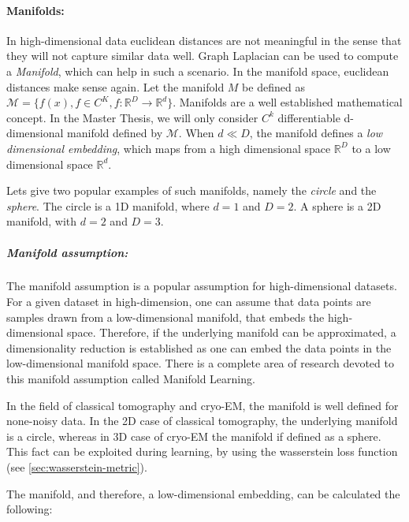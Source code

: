 \paragraph{Manifolds:}
\label{sec:manifolds}

In high-dimensional data euclidean distances are not meaningful in the sense that they will not capture similar data well.
Graph Laplacian can be used to compute a \textit{Manifold}, which can help in such a scenario. In the manifold space, euclidean distances make sense again. 
Let the manifold $M$ be defined as $\mathcal{M} = \{ f(x), f \in C^K, f: \mathbb{R}^D \to \mathbb{R}^d \}$.
Manifolds are a well established mathematical concept. In the Master Thesis, we will only consider 
$C^k$ differentiable d-dimensional manifold defined by $\mathcal{M}$. 
When $d \ll D$, the manifold defines a \textit{low dimensional embedding}, which maps from a high dimensional space 
$\mathbb{R}^D$ to a low dimensional space $\mathbb{R}^d$.

Lets give two popular examples of such manifolds, namely the \textit{circle} and the \textit{sphere}.
The circle is a 1D manifold, where $d=1$ and $D=2$. A sphere is a 2D manifold, with $d=2$ and $D=3$.

\subparagraph{Manifold assumption:}
\label{sec:manifoldAssumption}
The manifold assumption is a popular assumption for high-dimensional datasets.
For a given dataset in high-dimension, one can assume that data points are samples drawn from a low-dimensional manifold,
that embeds the high-dimensional space. Therefore, if the underlying manifold can be approximated, a dimensionality reduction
is established as one can embed the data points in the low-dimensional manifold space.
There is a complete area of research devoted to this manifold assumption called Manifold Learning\cite{ManifoldLearning}.

\begin{tcolorbox}[colback=red!5!white,colframe=red!75!black]
    In the field of classical tomography and cryo-EM, the manifold is well defined for none-noisy data.
    In the 2D case of classical tomography, the underlying manifold is a circle, whereas in 3D case of cryo-EM the manifold
    if defined as a sphere.
    This fact can be exploited during learning, by using the wasserstein loss function (see \ref{sec:wasserstein-metric}).
\end{tcolorbox}

The manifold, and therefore, a low-dimensional embedding, can be calculated the following:

